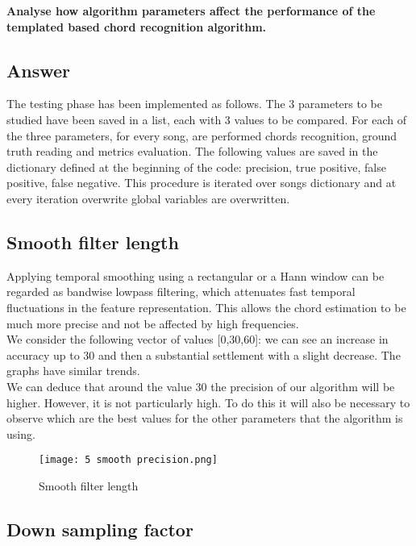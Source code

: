 \documentclass{article}
\begin{document}
\begin{problem}
	\textbf{Analyse how algorithm parameters affect the performance of the templated based chord recognition algorithm.}
\end{problem}

\subsection*{\color{blue}Answer}

The testing phase has been implemented as follows. The 3 parameters to be studied have been saved in a list, each with 3 values to be compared. For each of the three parameters, for every song, are performed chords recognition, ground truth reading and metrics evaluation. The following values are saved in the dictionary defined at the beginning of the code: precision, true positive, false positive, false negative.
This procedure is iterated over songs dictionary and at every iteration overwrite global variables are overwritten.

\subsection*{Smooth filter length} 

Applying temporal smoothing using a rectangular or a Hann window can be regarded as bandwise lowpass filtering, which attenuates fast temporal fluctuations in the feature representation. This allows the chord estimation to be much more precise and not be affected by high frequencies. \\
We consider the following vector of values [0,30,60]: we can see an increase in accuracy up to 30 and then a substantial settlement with a slight decrease. The graphs have similar trends.\\
We can deduce that around the value 30 the precision of our algorithm will be higher. However, it is not particularly high. To do this it will also be necessary to observe which are the best values for the other parameters that the algorithm is using. \\

\begin{figure}[H]
 \centering
 \texttt{[image: 5 smooth precision.png]}
 \caption{Smooth filter length}
\end{figure}

\subsection*{Down sampling factor}
\end{document}

